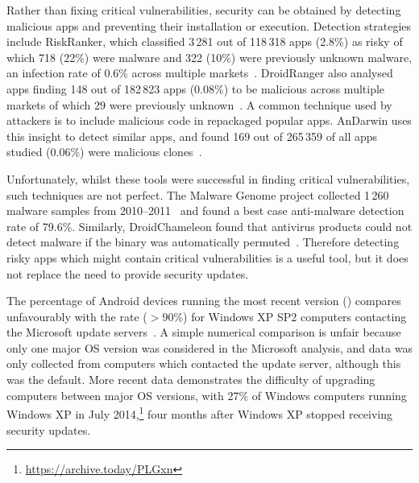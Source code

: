 \documentclass{llncs}
\begin{document}
Rather than fixing critical vulnerabilities, security can be obtained by detecting malicious apps and preventing their installation or execution.
Detection strategies include RiskRanker, which classified 3\,281 out of 118\,318 apps (2.8\%) as risky of which 718 (22\%) were malware and 322 (10\%) were previously unknown malware, an infection rate of 0.6\% across multiple markets~\cite{Grace2012a}.
DroidRanger also analysed apps finding 148 out of 182\,823 apps (0.08\%) to be malicious across multiple markets of which 29 were previously unknown~\cite{Zhou2012a}.
A common technique used by attackers is to include malicious code in repackaged popular apps. 
AnDarwin uses this insight to detect similar apps, and found 169 out of 265\,359 of all apps studied (0.06\%) were malicious clones~\cite{Crussell2013}.

Unfortunately, whilst these tools were successful in finding critical vulnerabilities, such techniques are not perfect.
The Malware Genome project collected 1\,260 malware samples from 2010--2011~\cite{Zhou2012b} and found a best case anti-malware detection rate of 79.6\%.
Similarly, DroidChameleon found that antivirus products could not detect malware if the binary was automatically permuted~\cite{Rastogi2013}.
Therefore detecting risky apps which might contain critical vulnerabilities is a useful tool, but it does not replace the need to provide security updates.



The percentage of Android devices running the most recent version (\daUpdatednessPerc) compares unfavourably with the rate ($>90$\%) for Windows XP SP2 computers contacting the Microsoft update servers~\cite{Gkantsidis2006}.
A simple numerical comparison is unfair because only one major OS version was considered in the Microsoft analysis, and data was only collected from computers which contacted the update server, although this was the default.
More recent data demonstrates the difficulty of upgrading computers between major OS versions, with 27\% of Windows computers running Windows XP in July 2014,\footnote{\url{https://archive.today/PLGxn}} four months after Windows XP stopped receiving security updates.
\end{document}
